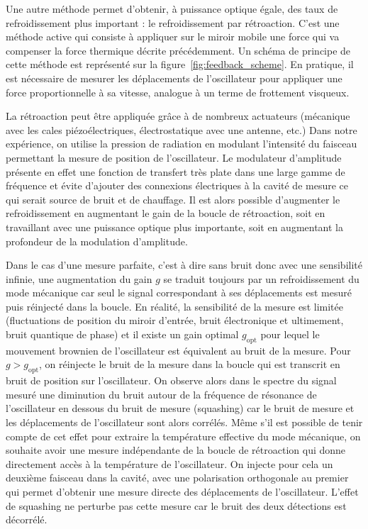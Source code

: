 \documentclass[12pt,a4paper]{article}
\begin{document}
Une autre méthode permet d'obtenir, à puissance optique égale, des taux de refroidissement plus important : le refroidissement par rétroaction.
C'est une méthode active qui consiste à appliquer sur le miroir mobile une force qui va compenser la force thermique décrite précédemment.
Un schéma de principe de cette méthode est représenté sur la figure~\ref{fig:feedback_scheme}.
En pratique, il est nécessaire de mesurer les déplacements de l'oscillateur pour appliquer une force proportionnelle à sa vitesse, analogue à un terme de frottement visqueux.

La rétroaction peut être appliquée grâce à de nombreux actuateurs (mécanique avec les cales piézoélectriques, électrostatique avec une antenne, etc.)
Dans notre expérience, on utilise la pression de radiation en modulant l'intensité du faisceau permettant la mesure de position de l'oscillateur.
Le modulateur d'amplitude présente en effet une fonction de transfert très plate dans une large gamme de fréquence et évite d'ajouter des connexions électriques à la cavité de mesure ce qui serait source de bruit et de chauffage.
Il est alors possible d'augmenter le refroidissement en augmentant le gain de la boucle de rétroaction, soit en travaillant avec une puissance optique plus importante, soit en augmentant la profondeur de la modulation d'amplitude.

Dans le cas d'une mesure parfaite, c'est à dire sans bruit donc avec une sensibilité infinie, une augmentation du gain $g$ se traduit toujours par un refroidissement du mode mécanique car seul le signal correspondant à ses déplacements est mesuré puis réinjecté dans la boucle.
En réalité, la sensibilité de la mesure est limitée (fluctuations de position du miroir d'entrée, bruit électronique et ultimement, bruit quantique de phase) et il existe un gain optimal $g_\mathrm{opt}$ pour lequel le mouvement brownien de l'oscillateur est équivalent au bruit de la mesure.
Pour $g>g_\mathrm{opt}$, on réinjecte le bruit de la mesure dans la boucle qui est transcrit en bruit de position sur l'oscillateur.
On observe alors dans le spectre du signal mesuré une diminution du bruit autour de la fréquence de résonance de l'oscillateur en dessous du bruit de mesure (squashing) car le bruit de mesure et les déplacements de l'oscillateur sont alors corrélés.
Même s'il est possible de tenir compte de cet effet pour extraire la température effective du mode mécanique, on souhaite avoir une mesure indépendante de la boucle de rétroaction qui donne directement accès à la température de l'oscillateur.
On injecte pour cela un deuxième faisceau dans la cavité, avec une polarisation orthogonale au premier qui permet d'obtenir une mesure directe des déplacements de l'oscillateur.
L'effet de squashing ne perturbe pas cette mesure car le bruit des deux détections est décorrélé.
\end{document}
